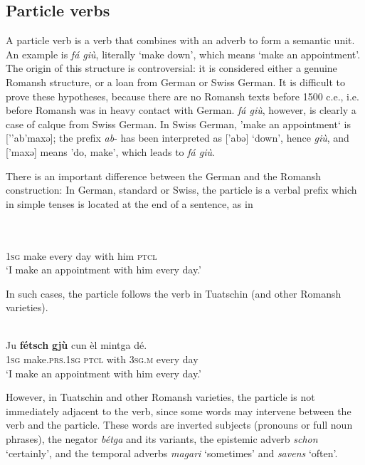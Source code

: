 \subsection{Particle verbs}
A particle verb is a verb that combines with an adverb to form a semantic unit. An example is\textit{ fá giù}, literally `make down', which means `make an appointment'.  The origin of this structure is controversial: it is considered either a genuine Romansh structure, or a loan from German or Swiss German. It is difficult to prove these hypotheses, because there are no Romansh texts before 1500 c.e., i.e. before Romansh was in heavy contact with German. \textit{fá giù}, however, is clearly a case of calque from Swiss German. In Swiss German, 'make an appointment` is [''ab'maxə]; the prefix \textit{ab}- has been interpreted as ['abə] `down', hence \textit{giù}, and  ['maxə] means 'do, make', which leads to \textit{fá giù}. 

There is an important difference between the German and the Romansh construction: In German, standard or Swiss, the particle is a verbal prefix which in simple tenses is located at the end of a sentence, as in

\ea\label{}
\\
\\
     \textsc{1sg}  make every day with him  \textsc{ptcl} \\
\glt `I make an appointment with him every day.'
\z

In such cases, the particle follows the verb in Tuatschin (and other Romansh varieties).

\ea\label{}
\\
\gll  Ju \textbf{fétsch} \textbf{gjù} cun èl mintga dé.\\
     \textsc{1sg}  make.\textsc{prs.1sg}  \textsc{ptcl} with \textsc{3sg.m}  every day\\
\glt `I make an appointment with him every day.'
\z

However, in Tuatschin and other Romansh varieties, the particle is not immediately adjacent to the verb, since some words may intervene between the verb and the particle. These words are inverted subjects (pronouns or full noun phrases), the negator \textit{bétga} and its variants, the epistemic adverb \textit{schon} `certainly', and the temporal adverbs \textit{magari} `sometimes' and \textit{savens} `often'. %

